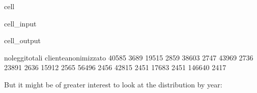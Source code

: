 \documentclass[letterpaper,10pt,english]{jupyterBook}
\begin{document}
\begin{sphinxuseclass}{cell}
\begin{sphinxuseclass}{cell_input}
\begin{sphinxVerbatim}[commandchars=\\\{\}]
   
      

      


\end{sphinxVerbatim}

\end{sphinxuseclass}
\begin{sphinxuseclass}{cell_output}
\begin{sphinxVerbatim}[commandchars=\\\{\}]
                      noleggi\PYGZus{}totali
cliente\PYGZus{}anonimizzato                
40585                           3689
19515                           2859
38603                           2747
43969                           2736
23891                           2636
15912                           2565
56496                           2456
42815                           2451
17683                           2451
146640                          2417
\end{sphinxVerbatim}

\end{sphinxuseclass}
\end{sphinxuseclass}
\sphinxAtStartPar
But it might be of greater interest to look at the distribution by year:
\end{document}
